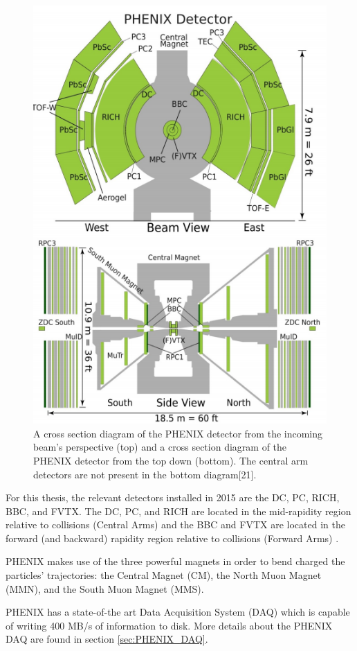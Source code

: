 \begin{figure}[!h]
\begin{center}
\includegraphics[width=0.7\linewidth]{figs/phenix_schematic.png}
\caption{A cross section diagram of the PHENIX detector from the incoming beam's perspective (top) and a cross section diagram of the PHENIX detector from the top down (bottom). The central arm detectors are not present in the bottom diagram[21].}
\label{fig:phenix_schematic}
\end{center}
\end{figure}

 For this thesis, the relevant detectors installed in 2015 are the DC, PC, RICH, BBC, and FVTX. The DC, PC, and RICH are located in the mid-rapidity region relative to collisions (Central Arms) and the BBC and FVTX are located in the forward (and backward) rapidity region relative to collisions (Forward Arms) \cite{Adcox2003469}. 

PHENIX makes use of the three powerful magnets in order to bend charged the particles' trajectories: the Central Magnet (CM), the North Muon Magnet (MMN), and the South Muon Magnet (MMS).

PHENIX has a state-of-the art Data Acquisition System (DAQ) which is capable of writing 400 MB/s of information to disk. More details about the PHENIX DAQ are found in section \ref{sec:PHENIX_DAQ}.

